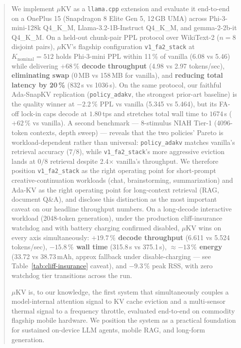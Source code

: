 \documentclass[sigconf, anonymous=false, screen=true]{acmart}
\newcommand{\good}[1]{\textcolor{endurkvgreen}{\textbf{#1}}}
\begin{document}
\begin{abstract}
We implement \textsc{$\mu$KV} as a \texttt{llama.cpp} extension and evaluate it end-to-end on a OnePlus 15 (Snapdragon 8 Elite Gen 5, 12\,GB UMA) across Phi-3-mini-128k Q4\_K\_M, Llama-3.2-1B-Instruct Q4\_K\_M, and gemma-2-2b-it Q4\_K\_M. On a held-out chunk-pair PPL protocol over WikiText-2 ($n{=}8$ disjoint pairs), \textsc{$\mu$KV}'s flagship configuration \texttt{v1\_fa2\_stack} at $K_{\text{nominal}}{=}512$ holds Phi-3-mini PPL within 11\,\% of vanilla (6.08 vs 5.46) while delivering \good{$+68\,\%$ decode throughput} (4.98 vs 2.97 tokens/sec), \good{eliminating swap} (0\,MB vs 158\,MB for vanilla), and \good{reducing total latency by 20\,\%} (832\,s vs 1036\,s). On the same protocol, our faithful Ada-SnapKV replication (\texttt{policy\_adakv}, the strongest prior-art baseline) is the quality winner at $-2.2\,\%$ PPL vs vanilla (5.345 vs 5.464), but its FA-off lock-in caps decode at $1.80$\,tps and stretches total wall time to $1674$\,s ($+62\,\%$ vs vanilla). A second benchmark --- 8-stimulus NIAH Tier-1 (4096-token contexts, depth sweep) --- reveals that the two policies' Pareto is workload-dependent rather than universal: \texttt{policy\_adakv} matches vanilla's retrieval accuracy ($7/8$), while \texttt{v1\_fa2\_stack}'s more aggressive eviction lands at $0/8$ retrieval despite 2.4$\times$ vanilla's throughput. We therefore position \texttt{v1\_fa2\_stack} as the right operating point for short-prompt creative-continuation workloads (chat, brainstorming, summarization) and Ada-KV as the right operating point for long-context retrieval (RAG, document Q\&A), and disclose this distinction as the most important caveat on our headline throughput numbers. On a long-decode interactive workload (2048-token generation), under the production cliff-insurance watchdog and with battery charging confirmed disabled, \textsc{$\mu$KV} wins on every axis simultaneously: \good{$+19.7\,\%$ decode throughput} (6.611 vs 5.524 tokens/sec), \good{$-15.8\,\%$ wall time} (315.8\,s vs 375.1\,s), \good{$\approx-13\,\%$ energy} (33.72 vs 38.73\,mAh, approx fallback under disable-charging --- see Table~\ref{tab:cliff-insurance} caveat), and $-9.3\,\%$ peak RSS, with zero watchdog tier transitions across the run.

\textsc{$\mu$KV} is, to our knowledge, the first system that simultaneously couples a model-internal attention signal to KV cache eviction and a multi-sensor thermal signal to a frequency throttle, evaluated end-to-end on commodity flagship mobile hardware. We position the system as a practical foundation for sustained on-device LLM agents, mobile RAG, and long-form generation.


\end{abstract}
\end{document}

